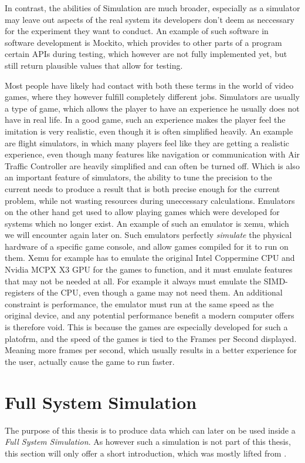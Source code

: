 In contrast, the abilities of Simulation are much broader,
especially as a simulator may leave out aspects of the real system
its developers don't deem as neccessary for the experiment they want to conduct.
An example of such software in software development is Mockito,
which provides to other parts of a program certain APIs during testing,
which however are not fully implemented yet,
but still return plausible values that allow for testing.

Most people have likely had contact with both these terms in the world of video games,
where they however fulfill completely different jobs.\linebreak
Simulators are usually a type of game,
which allows the player to have an experience he usually does not have in real life.
In a good game, such an experience makes the player feel the imitation is very realistic,
even though it is often simplified heavily.
An example are flight simulators, in which many players feel like they are getting a realistic experience,
even though many features like navigation or communication with Air Traffic Controller are heavily simplified
and can often be turned off.
Which is also an important feature of simulators, the ability to tune the precision
to the current needs to produce a result that is both precise enough for the current problem,
while not wasting resources during uneccessary calculations.\linebreak
Emulators on the other hand get used to allow playing games which were developed for systems which no longer exist.
An example of such an emulator is xemu\cite{xemu},
which we will encounter again later on.
Such emulators perfectly \emph{simulate} the physical hardware of a specific game console,
and allow games compiled for it to run on them.
Xemu for example has to emulate the original Intel Coppermine CPU and Nvidia MCPX X3 GPU
for the games to function, and it must emulate features that may not be needed at all.
For example it always must emulate the SIMD-registers of the CPU, even though a game may not need them.
An additional constraint is performance, the emulator must run at the same speed as the original device,
and any potential performance benefit a modern computer offers is therefore void.
This is because the games are especially developed for such a platofrm,
and the speed of the games is tied to the Frames per Second displayed.
Meaning more frames per second, which usually results in a better experience for the user,
actually cause the game to run faster.

\section{Full System Simulation}
The purpose of this thesis is to produce data which can later on be used inside a \emph{Full System Simulation}.
As however such a simulation is not part of this thesis, this section will only offer a short introduction,
which was mostly lifted from \cite{kitcheckpoints}.

